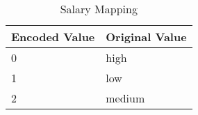 \begin{table}[H]\centering
\caption{Salary Mapping}
\label{tab:salary_mapping}
\begin{tabular}{ll}
\toprule
Encoded Value & Original Value \\
\midrule
0 & high \\
1 & low \\
2 & medium \\
\bottomrule
\end{tabular}
\end{table}
